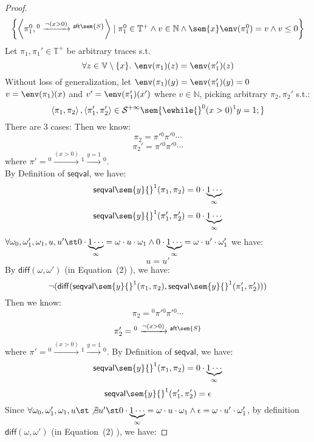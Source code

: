 \begin{example}
\begin{proof}
\begin{equation}
\begin{array}{ll}
 \left\{ \left< \pi_1^0, {}^0 \xrightarrow{\neg(x > 0)} {}^{\mathsf{aft}\sem{S}} \right> 
 \mid \pi_1^0 \in \mathbb{T^{+}} \land v \in \mathbb{N} \land
  \sem{x}\env(\pi_1^0) = v
 \land v \leq 0 \right\}
 \end{array} 
 \end{equation}
 Let $\pi_1, \pi_1' \in \mathbb{T^{+}}$ be arbitrary traces s.t. 
 $$\forall z \in \mathbb{V}\setminus \{x\}. ~ \env(\pi_1)(z) = \env(\pi_1')(z) $$ 
 Without loss of generalization, let $\env(\pi_1)(y) = \env(\pi_1')(y) = 0$
$v = \env(\pi_1)(x) $ and $v' = \env(\pi'_1)(x')$ where $v \in \mathbb{N}$, picking arbitrary $\pi_2, \pi_2'$ s.t.:
 \[
 	\left< \pi_1, \pi_2 \right>,  \left< \pi'_1, \pi'_2 \right> 
  \in \mathcal{S}^{+\infty}\sem{\ewhile {}^0 (x > 0) {}^1 y = 1; }
 \]
 There are 3 cases:
 Then we know:
 \[
 \pi_2 =  \pi' {}^0 \pi' {}^0\cdots 
\]
%
\[ 
 \pi_2' =  \pi' {}^0 \pi' {}^0\cdots 
 \]
 where $\pi'  = {}^0 \xrightarrow{(x > 0)} {}^1 \xrightarrow{y = 1} {}^0$.
 \\
 By Definition of $\mathsf{seqval}$, we have:
 \[
  \mathsf{seqval}\sem{y}{}^1(\pi_1, \pi_2 ) =  0 \cdot \underbrace{ 1 \cdots}_{\infty}
 \]
 \[
  \mathsf{seqval}\sem{y}{}^1(\pi_1', \pi_2' ) =  0 \cdot \underbrace{1  \cdots}_{\infty}
 \]
  $\forall \omega_0, \omega_1', \omega_1, u, u' \st 
  0 \cdot \underbrace{1 \cdots}_{\infty} = \omega \cdot u \cdot \omega_1 
  \land 0 \cdot \underbrace{1 \cdots}_{\infty} = \omega \cdot u' \cdot \omega_1'$ we have:
 \[
  u = u'
 \]
 By $\mathsf{diff}(\omega, \omega')$ (in \cite{cousot2019abstract} Equation~(2) ), we have:
 \[
  \neg(\mathsf{diff}(\mathsf{seqval}\sem{y}{}^1(\pi_1, \pi_2 ), \mathsf{seqval}\sem{y}{}^1(\pi_1', \pi_2' )))
 \]
 Then we know:
  \[
  \pi_2 = {}^0 \pi' {}^0 \pi' {}^0 \cdots 
  \]
  \[
  \pi_2' = {}^0 \xrightarrow{\neg(x > 0)} {}^{\mathsf{aft}\sem{S}}
  \]
 where $\pi'  = {}^0 \xrightarrow{(x > 0)} {}^1 \xrightarrow{y = 1} {}^0$.
 By Definition of $\mathsf{seqval}$, we have:
 \[
  \mathsf{seqval}\sem{y}{}^1(\pi_1, \pi_2 ) = 0 \cdot \underbrace{1 \cdots}_{\infty}
 \]
 \[
  \mathsf{seqval}\sem{y}{}^1(\pi'_1, \pi_2' ) = \epsilon
 \]
 Since $\forall \omega_0, \omega_1', \omega_1, u\st \not\exists u' \st 
  0 \cdot \underbrace{1 \cdots}_{\infty} = \omega \cdot u \cdot \omega_1 
  \land \epsilon = \omega \cdot u' \cdot \omega_1'$,
by definition $\mathsf{diff}(\omega, \omega')$ (in \cite{cousot2019abstract} Equation~(2) ), we have:

\end{proof}
\end{example}
